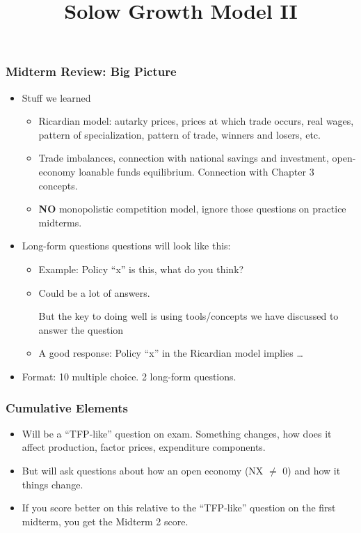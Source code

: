 \documentclass[9pt]{beamer}
\title[NYU Stern] %
{\huge Solow Growth Model II}
\author[Michael Waugh] %
{\bf{\Large}}%
\date[] %
\begin{document}



\begin{frame}[t]
\frametitle{Midterm Review: Big Picture}
\begin{itemize}
\item Stuff we learned
\begin{itemize}
\medskip
\item Ricardian model: autarky prices, prices at which trade occurs, real wages, pattern of specialization, pattern of trade, winners and losers, etc.
\medskip
\item Trade imbalances, connection with national savings and investment, open-economy loanable funds equilibrium. Connection with Chapter 3 concepts. 
\medskip
\item \textbf{NO} monopolistic competition model, ignore those questions on practice midterms.
\end{itemize}
\bigskip
\item Long-form questions questions will look like this:
\begin{itemize}
\medskip
\item Example: Policy ``x'' is this, what do you think?
\medskip
\item Could be a lot of answers. \begin{alertenv}{But the key to doing well is using tools/concepts we have discussed to answer the question}\end{alertenv}
\medskip
\item A good response: Policy ``x'' in the Ricardian model implies \ldots
\end{itemize}
\medskip
\item Format: 10 multiple choice. 2 long-form questions.
\end{itemize}
\bigskip
\end{frame}



\begin{frame}[t]
\frametitle{Cumulative Elements}
\begin{itemize}
\item Will be a ``TFP-like'' question on exam. Something changes, how does it affect production, factor prices, expenditure components.
\medskip
\item But will ask questions about how an open economy (NX $\neq$ 0) and how it things change. 
\medskip
\item If you score better on this relative to the ``TFP-like'' question on the first midterm, you get the Midterm 2 score. 
\end{itemize}
\end{frame}
\end{document}
